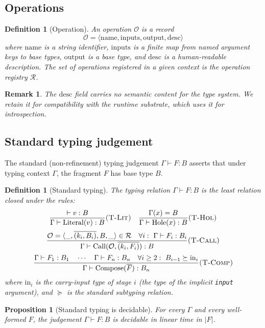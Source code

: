 \documentclass[twocolumn,11pt,a4paper]{article}
\newtheorem{proposition}[theorem]{Proposition}
\newtheorem{definition}[theorem]{Definition}
\newtheorem{remark}[theorem]{Remark}
\newcommand{\Reg}{\mathcal{R}}
\newcommand{\Frag}{F}
\newcommand{\Ctx}{\Gamma}
\newcommand{\Op}{\mathcal{O}}
\newcommand{\rul}[1]{\textsc{(#1)}}
\newcommand{\vCall}[2]{\mathrm{Call}(#1,#2)}
\newcommand{\vComp}[1]{\mathrm{Compose}(#1)}
\newcommand{\vLit}[1]{\mathrm{Literal}(#1)}
\newcommand{\vHol}[1]{\mathrm{Hole}(#1)}
\begin{document}
\subsection{Operations}

\begin{definition}[Operation]
\label{def:operation}
An operation $\Op$ is a record
\[
\Op = \langle \mathrm{name}, \mathrm{inputs}, \mathrm{output}, \mathrm{desc}\rangle
\]
where $\mathrm{name}$ is a string identifier, $\mathrm{inputs}$ is a finite map from named argument keys to base types, $\mathrm{output}$ is a base type, and $\mathrm{desc}$ is a human-readable description. The set of operations registered in a given context is the \emph{operation registry} $\Reg$.
\end{definition}

\begin{remark}
The $\mathrm{desc}$ field carries no semantic content for the type system. We retain it for compatibility with the runtime substrate, which uses it for introspection.
\end{remark}

\subsection{Standard typing judgement}

The standard (non-refinement) typing judgement $\Ctx \vdash \Frag : B$ asserts that under typing context $\Ctx$, the fragment $\Frag$ has base type $B$.

\begin{definition}[Standard typing]
\label{def:standard-typing}
The typing relation $\Ctx \vdash \Frag : B$ is the least relation closed under the rules:
\[
\frac{\vdash v : B}{\Ctx \vdash \vLit{v} : B} \rul{T-Lit}
\quad
\frac{\Ctx(x) = B}{\Ctx \vdash \vHol{x} : B} \rul{T-Hol}
\]
\[
\frac{\Op = \langle\_,\overline{(k_i, B_i)}, B,\_\rangle \in \Reg \quad \forall i:\ \Ctx \vdash \Frag_i : B_i}{\Ctx \vdash \vCall{\Op}{\overline{(k_i, \Frag_i)}} : B} \rul{T-Call}
\]
\[
\frac{\Ctx \vdash \Frag_1 : B_1 \quad \cdots \quad \Ctx \vdash \Frag_n : B_n \quad \forall i \geq 2:\ B_{i-1} \mathrel{\succeq} \mathrm{in}_i}{\Ctx \vdash \vComp{\overline{\Frag}} : B_n} \rul{T-Comp}
\]
where $\mathrm{in}_i$ is the carry-input type of stage $i$ (the type of the implicit \texttt{input} argument), and $\mathrel{\succeq}$ is the standard subtyping relation.
\end{definition}

\begin{proposition}[Standard typing is decidable]
\label{prop:standard-decidable}
For every $\Ctx$ and every well-formed $\Frag$, the judgement $\Ctx \vdash \Frag : B$ is decidable in linear time in $|\Frag|$.
\end{proposition}
\end{document}

